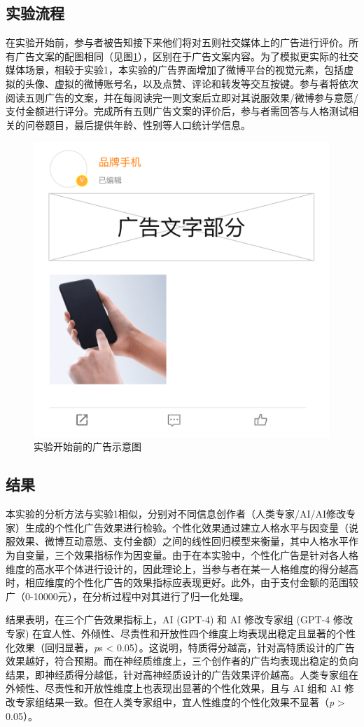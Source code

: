 \subsection{实验流程}
在实验开始前，参与者被告知接下来他们将对五则社交媒体上的广告进行评价。所有广告文案的配图相同（见图\ref{fig:Study2-exp2-ad-example}），区别在于广告文案内容。为了模拟更实际的社交媒体场景，相较于实验1，本实验的广告界面增加了微博平台的视觉元素，包括虚拟的头像、虚拟的微博账号名，以及点赞、评论和转发等交互按键。参与者将依次阅读五则广告的文案，并在每阅读完一则文案后立即对其说服效果/微博参与意愿/支付金额进行评分。完成所有五则广告文案的评价后，参与者需回答与人格测试相关的问卷题目，最后提供年龄、性别等人口统计学信息。

\begin{figure}[htbp]
    \centering
    \includegraphics[width=.3\linewidth]{Image/Study2-exp2.png}
    \caption{\label{fig:Study2-exp2-ad-example}实验开始前的广告示意图}
\end{figure}


\subsection{结果}
本实验的分析方法与实验1相似，分别对不同信息创作者（人类专家/AI/AI修改专家）生成的个性化广告效果进行检验。个性化效果通过建立人格水平与因变量（说服效果、微博互动意愿、支付金额）之间的线性回归模型来衡量，其中人格水平作为自变量，三个效果指标作为因变量。由于在本实验中，个性化广告是针对各人格维度的高水平个体进行设计的，因此理论上，当参与者在某一人格维度的得分越高时，相应维度的个性化广告的效果指标应表现更好。此外，由于支付金额的范围较广（0-10000元），在分析过程中对其进行了归一化处理。

结果表明，在三个广告效果指标上，AI (GPT-4) 和 AI 修改专家组 (GPT-4 修改专家) 在宜人性、外倾性、尽责性和开放性四个维度上均表现出稳定且显著的个性化效果（回归显著，\textit{p}s < 0.05）。这说明，特质得分越高，针对高特质设计的广告效果越好，符合预期。而在神经质维度上，三个创作者的广告均表现出稳定的负向结果，即神经质得分越低，针对高神经质设计的广告效果评价越高。人类专家组在外倾性、尽责性和开放性维度上也表现出显著的个性化效果，且与 AI 组和 AI 修改专家组结果一致。但在人类专家组中，宜人性维度的个性化效果不显著（\textit{p} > 0.05）。

